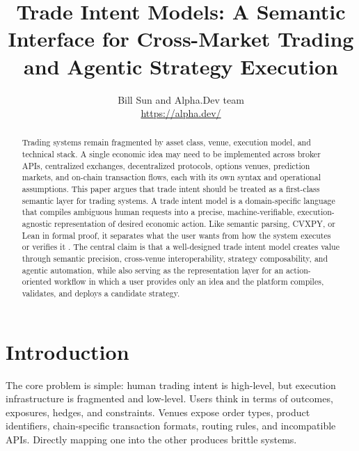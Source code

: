 \documentclass{article}
\title{Trade Intent Models: A Semantic Interface for Cross-Market Trading and Agentic Strategy Execution}
\author{Bill Sun and Alpha.Dev team\\ \url{https://alpha.dev/}}
\date{}
\begin{document}
\maketitle
\small

\begin{center}
\end{center}

\begin{abstract}
Trading systems remain fragmented by asset class, venue, execution model, and technical stack. A single economic idea may need to be implemented across broker APIs, centralized exchanges, decentralized protocols, options venues, prediction markets, and on-chain transaction flows, each with its own syntax and operational assumptions. This paper argues that trade intent should be treated as a first-class semantic layer for trading systems. A trade intent model is a domain-specific language that compiles ambiguous human requests into a precise, machine-verifiable, execution-agnostic representation of desired economic action. Like semantic parsing, CVXPY, or Lean in formal proof, it separates what the user wants from how the system executes or verifies it \citep{kamath2018survey,diamond2016cvxpy,demoura2015lean}. The central claim is that a well-designed trade intent model creates value through semantic precision, cross-venue interoperability, strategy composability, and agentic automation, while also serving as the representation layer for an action-oriented workflow in which a user provides only an idea and the platform compiles, validates, and deploys a candidate strategy.
\end{abstract}

\section{Introduction}

The core problem is simple: human trading intent is high-level, but execution infrastructure is fragmented and low-level. Users think in terms of outcomes, exposures, hedges, and constraints. Venues expose order types, product identifiers, chain-specific transaction formats, routing rules, and incompatible APIs. Directly mapping one into the other produces brittle systems.
\end{document}
